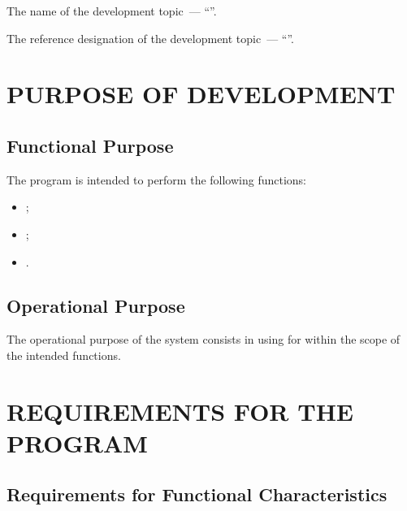 \documentclass[12pt,a4paper]{extarticle}
\begin{document}
The name of the development topic~--- \enquote{\projectname}.

The reference designation of the development topic~--- \enquote{}.

\clearpage

\section{PURPOSE OF DEVELOPMENT}

\subsection{Functional Purpose}

The program is intended to perform the following functions:
\begin{itemize}[nosep, leftmargin=1.25cm]
    \item {};
    \item {};
    \item {}.
\end{itemize}

\subsection{Operational Purpose}

The operational purpose of the system consists in using  for  within the scope of the intended functions.

\clearpage

\section{REQUIREMENTS FOR THE PROGRAM}

\subsection{Requirements for Functional Characteristics}
\label{sec:functional_reqs}
\end{document}
